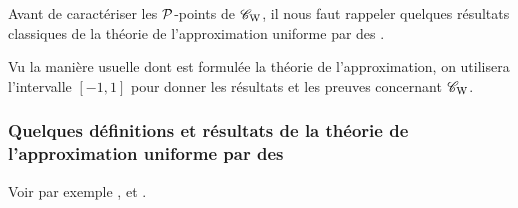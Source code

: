 \smallskip Avant de caractériser les ${\cal P}$-points de ${{{\mathscr C}}_{\rm W}}$, il nous faut rappeler quelques 
résultats classiques de la théorie de l'approximation uniforme par des 
\pols.

 Vu la manière usuelle dont est formulée la théorie 
de l'approximation, on utilisera l'intervalle     $[-1,1]$ pour donner les 
résultats et les preuves concernant  ${{{\mathscr C}}_{\rm W}}$.


\subsubsection{Quelques définitions et résultats de la théorie de 
l'approximation uniforme par des \pols}\label{fsubsubsecf521}

Voir par exemple  \cite{fBa}, \cite{fRi}  et   \cite{fCh}. 

